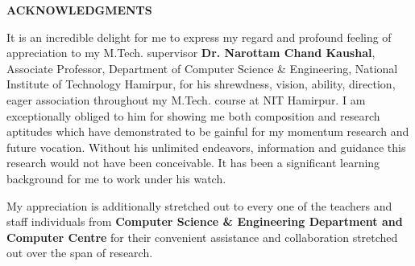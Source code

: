 \vspace{4.0\baselineskip}
\textbf{\hspace{2.5cm} \LARGE \textbf{ACKNOWLEDGMENTS}}

\vspace{15mm}

It is an incredible delight for me to express my regard and profound feeling of appreciation to my M.Tech. supervisor \textbf{Dr. Narottam Chand Kaushal}, Associate Professor, Department of Computer Science \& Engineering, National Institute of Technology Hamirpur, for his shrewdness, vision, ability, direction, eager association throughout my M.Tech. course at NIT Hamirpur. I am exceptionally obliged to him for showing me both composition and research aptitudes which have demonstrated to be gainful for my momentum research and future vocation. Without his unlimited endeavors, information and guidance this research would not have been conceivable. It has been a significant learning background for me to work under his watch.\\


\par My appreciation is additionally stretched out to every one of the teachers and staff individuals from \textbf{Computer Science \& Engineering Department and Computer Centre} for their convenient assistance and collaboration stretched out over the span of research.\\

